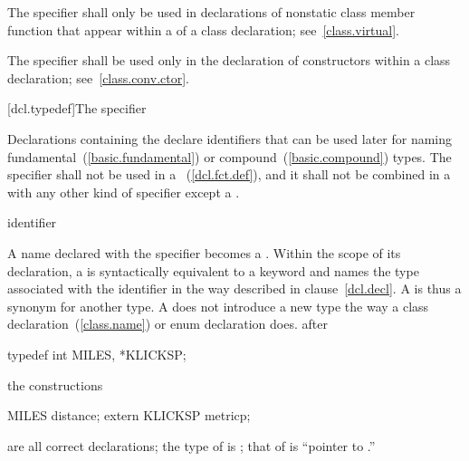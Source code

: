 \pnum
{}%
The  specifier shall only be used in declarations of
nonstatic class member function that appear within a
 of a class declaration;
see~\ref{class.virtual}.

\pnum
{}%
The  specifier shall be used only in the declaration of
constructors within a class declaration; see~\ref{class.conv.ctor}.

[dcl.typedef]{The  specifier}%

\pnum
Declarations containing the  
declare identifiers that can be used later for naming
fundamental~(\ref{basic.fundamental}) or compound~(\ref{basic.compound})
types. The  specifier shall not be used in a
~(\ref{dcl.fct.def}), and it shall
not be combined in a  with any other
kind of specifier except a .

\begin{bnf}
\br
    identifier
\end{bnf}

A name declared with the  specifier becomes a
. Within the scope of its declaration, a
 is syntactically equivalent to a keyword and
names the type associated with the identifier in the way described in
clause~\ref{dcl.decl}.
%
%
%
A  is thus a synonym for another type. A
 does not introduce a new type the way a class
declaration~(\ref{class.name}) or enum declaration does.
\enterexample
{}%
after

\begin{codeblock}
typedef int MILES, *KLICKSP;
\end{codeblock}

the constructions

\begin{codeblock}
MILES distance;
extern KLICKSP metricp;
\end{codeblock}

are all correct declarations; the type of  is
; that of  is ``pointer to .''
\exitexample

